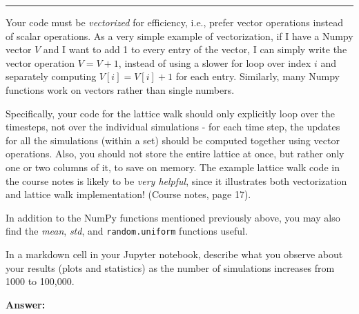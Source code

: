 \documentclass[11pt]{article}
\newcounter{problem}
\newenvironment{problem}{%
    \refstepcounter{problem}%
    \Needspace{7\baselineskip}%
    \par\vspace{0.7em}%
    \noindent\textcolor{courseblue}{\rule{\textwidth}{0.4pt}}%
    \par\vspace{0.5em}%
    \begin{list}{}{%
        \setlength{\leftmargin}{2.3em}%
        \setlength{\labelwidth}{1.8em}%
        \setlength{\labelsep}{0.5em}%
        \setlength{\topsep}{0pt}%
        \setlength{\partopsep}{0pt}%
    }%
    \item[\theproblem.]
}{\end{list}\par\vspace{0.5em}}
\newenvironment{answer}{%
    \Needspace{4\baselineskip}%
    \par\vspace{0.35em}\noindent\textbf{Answer:}\par
}{\par\vspace{1.5em}}
\begin{document}
\begin{problem}
Your code must be \emph{vectorized} for efficiency, i.e., prefer vector operations instead of scalar operations.
As a very simple example of vectorization, if I have a Numpy vector $V$ and I want to
add 1 to every entry of the vector, I can simply write the vector operation $V=V+1$, instead
of using a slower for loop over index $i$ and separately computing $V[i]=V[i]+1$ for each entry.
Similarly, many Numpy functions work on vectors rather than single numbers.

Specifically, your code for the lattice walk should only explicitly loop over the timesteps, not
over the individual simulations - for each time step, the updates for all the simulations (within a
set) should be computed together using vector operations. Also, you should not store the entire
lattice at once, but rather only one or two columns of it, to save on memory. The example lattice
walk code in the course notes is likely to be \emph{very helpful}, since it illustrates both vectorization
and lattice walk implementation! (Course notes, page 17).

In addition to the NumPy functions mentioned previously above, you may also find the \emph{mean},
\emph{std}, and \texttt{random.uniform} functions useful.

In a markdown cell in your Jupyter notebook, describe what you observe about your results
(plots and statistics) as the number of simulations increases from 1000 to 100,000.
\begin{answer}
\end{answer}
\end{problem}
\end{document}

